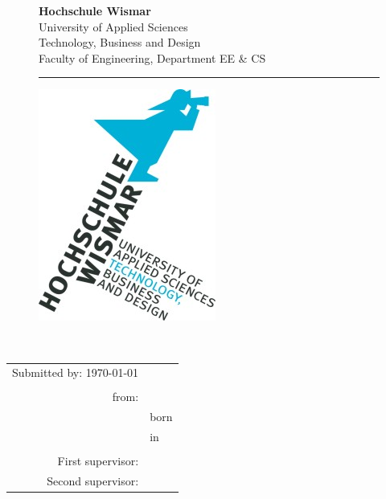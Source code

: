 \begin{titlepage}
	\setlength\headsep{-5mm}
	\begin{figure}[!h]
		\begin{minipage}{0.8\textwidth}
			\textbf{Hochschule Wismar} \\
			University of Applied Sciences \\
			Technology, Business and Design \\
			Faculty of Engineering, Department EE \&{} CS \\
		\rule{\textwidth}{0.5pt}
		\end{minipage}
		\begin{minipage}[r]{0.1\textwidth}
			\begin{flushright}
				\includegraphics[height=6\baselineskip]{pics/HSLogo.jpg}
			\end{flushright}
		\end{minipage}
	\end{figure}
	\vspace*{6cm}
	\begin{center}
		\Huge
		\textbf{\documentType} \\
		\vspace{2cm}
		\large \thetitle
		\begin{table}[b]
			\begin{tabular}{rl}
				Submitted by:  \today \\
				\\
				from: & \theauthor \\
				& born \birthday \\
				& in \birthplace \\
				\\
				First supervisor: & \firstTutor \\
				Second supervisor: & \secondTutor
			\end{tabular}
		\end{table}
	\end{center}
\end{titlepage}